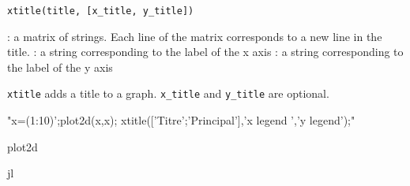 
\begin{mandesc}
\end{mandesc}

\begin{calling_sequence}
\begin{verbatim}
xtitle(title, [x_title, y_title])
\end{verbatim}
\end{calling_sequence}
\begin{parameters}
  \begin{varlist}
    : a matrix of strings. Each line of the matrix corresponds to a new line
    in the title.
    : a string corresponding to the label of the x axis
    : a string corresponding to the label of the y axis
\end{varlist}
\end{parameters}

\begin{mandescription}
  \verb+xtitle+ adds a title to a graph. \verb+x_title+ and \verb+y_title+ are optional.
\end{mandescription}

\begin{examples}
  \begin{program}
    "x=(1:10)';plot2d(x,x);
    xtitle(['Titre';'Principal'],'x legend ','y legend');"
  \end{program}
\end{examples}

\begin{manseealso}
  plot2d
\end{manseealso}

\begin{authors}
   jl
\end{authors}
